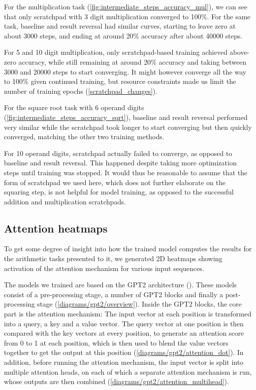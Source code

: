 For the multiplication task (\cref{fig:intermediate_steps_accuracy_mul}), we can see that only scratchpad with 3 digit multiplication converged to 100\%. For the same task, baseline and result reversal had similar curves, starting to leave zero at about 3000 steps, and ending at around 20\% accuracy after about 40000 steps.

For 5 and 10 digit multiplication, only scratchpad-based training achieved above-zero accuracy, while still remaining at around 20\% accuracy and taking between 3000 and 20000 steps to start converging.
It might however converge all the way to 100\% given continued training, but resource constraints made us limit the number of training epochs (\cref{scratchpad_changes}).


For the square root task with 6 operand digits (\cref{fig:intermediate_steps_accuracy_sqrt}), baseline and result reversal performed very similar while the scratchpad took longer to start converging but then quickly converged, matching the other two training methods.

For 10 operand digits, scratchpad actually failed to converge, as opposed to baseline and result reversal. This happened despite taking more optimization steps until training was stopped. It would thus be reasonable to assume that the form of scratchpad we used here, which does not further elaborate on the squaring step, is not helpful for model training, as opposed to the successful addition and multiplication scratchpads.

\subsection{Attention heatmaps}
\label{heatmap}

To get some degree of insight into how the trained model computes the results for the arithmetic tasks presented to it, we generated 2D heatmaps showing activation of the attention mechanism for various input sequences.

The models we trained are based on the GPT2 architecture (\cite{unsupervisedmultitask}). These models consist of a pre-processing stage, a number of GPT2 blocks and finally a post-processing stage (\cref{diagrams/gpt2/overview}). Inside the GPT2 blocks, the core part is the attention mechanism: The input vector at each position is transformed into a query, a key and a value vector. The query vector at one position is then compared with the key vectors at every position, to generate an attention score from 0 to 1 at each position, which is then used to blend the value vectors together to get the output at this position (\cref{diagrams/gpt2/attention_dot}).
In addition, before running the attention mechanism, the input vector is split into multiple attention heads, on each of which a separate attention mechanism is run, whose outputs are then combined (\cref{diagrams/gpt2/attention_multihead}).

